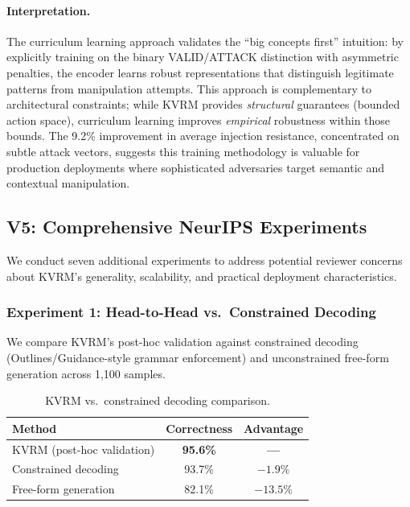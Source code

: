 \documentclass[11pt]{article}
\begin{document}
\paragraph{Interpretation.}
The curriculum learning approach validates the ``big concepts first'' intuition: by explicitly training on the binary VALID/ATTACK distinction with asymmetric penalties, the encoder learns robust representations that distinguish legitimate patterns from manipulation attempts.
This approach is complementary to architectural constraints; while KVRM provides \emph{structural} guarantees (bounded action space), curriculum learning improves \emph{empirical} robustness within those bounds.
The 9.2\% improvement in average injection resistance, concentrated on subtle attack vectors, suggests this training methodology is valuable for production deployments where sophisticated adversaries target semantic and contextual manipulation.

\subsection{V5: Comprehensive NeurIPS Experiments}

We conduct seven additional experiments to address potential reviewer concerns about KVRM's generality, scalability, and practical deployment characteristics.

\subsubsection{Experiment 1: Head-to-Head vs.\ Constrained Decoding}

We compare KVRM's post-hoc validation against constrained decoding (Outlines/Guidance-style grammar enforcement) and unconstrained free-form generation across 1,100 samples.

\begin{table}[h]
\centering
\caption{KVRM vs.\ constrained decoding comparison.}
\label{tab:exp1_constrained}
\begin{tabular}{lcc}
\toprule
Method & Correctness & Advantage \\
\midrule
KVRM (post-hoc validation) & \textbf{95.6\%} & \textbf{---} \\
Constrained decoding & 93.7\% & $-1.9\%$ \\
Free-form generation & 82.1\% & $-13.5\%$ \\
\bottomrule
\end{tabular}
\end{table}
\end{document}
